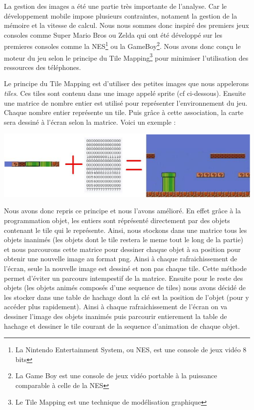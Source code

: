 		La gestion des images a été une partie très importante de l'analyse. Car le développement mobile impose plusieurs contraintes, notament la gestion de la mémoire et la vitesse de calcul. Nous nous sommes donc inspiré des premiers jeux consoles comme Super Mario Bros ou Zelda qui ont été développé sur les premieres consoles comme la NES\footnote{La Nintendo Entertainment System, ou NES, est une console de jeux vidéo 8 bits} ou la GameBoy\footnote{La Game Boy  est une console de jeux vidéo portable à la puissance comparable à celle de la NES}. Nous avons donc conçu le moteur du jeu selon le principe du Tile Mapping\footnote{Le Tile Mapping est une technique de modélisation graphique} pour minimiser l'utilisation des ressources des téléphones.
		
		Le principe du Tile Mapping est d'utiliser des petites images que nous appelerons \textit{tiles}. Ces tiles sont contenu dans une image appelé sprite (cf ci-dessous).
		Ensuite une matrice de nombre entier est utilisé pour représenter l'environnement du jeu. Chaque nombre entier représente un tile. Puis grâce à cette association, la carte sera dessiné à l'écran selon la matrice. Voici un exemple :
		
		\includegraphics[width=15cm]{./Analyse/Img/tileMapping.eps}
		
		
		Nous avons donc repris ce principe et nous l'avons amélioré. En effet grâce à la programmation objet, les entiers sont réprésenté directement par des objets contenant le tile qui le représente. Ainsi, nous stockons dans une matrice tous les objets inanimés (les objets dont le tile restera le meme tout le long de la partie) et nous parcourons cette matrice pour dessiner chaque objet à sa position pour obtenir une nouvelle image au format png. Ainsi à chaque rafraichissement de l'écran, seule la nouvelle image est dessiné et non pas chaque tile. Cette méthode permet d'éviter un parcours intempestif de la matrice.
		Ensuite pour le reste des objets (les objets animés composés d'une sequence de tiles) nous avons décidé de les stocker dans une table de hachage dont la clé est la position de l'objet (pour y accéder plus rapidement). Ainsi à chaque rafraichissement de l'écran on va dessiner l'image des objets inanimés puis parcourir entierement la table de hachage et dessiner le tile courant de la sequence d'animation de chaque objet.
		
